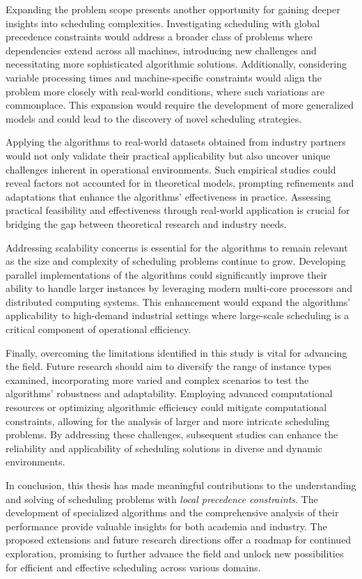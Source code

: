 Expanding the problem scope presents another opportunity for gaining deeper insights into scheduling complexities. Investigating scheduling with global precedence constraints would address a broader class of problems where dependencies extend across all machines, introducing new challenges and necessitating more sophisticated algorithmic solutions. Additionally, considering variable processing times and machine-specific constraints would align the problem more closely with real-world conditions, where such variations are commonplace. This expansion would require the development of more generalized models and could lead to the discovery of novel scheduling strategies.

Applying the algorithms to real-world datasets obtained from industry partners would not only validate their practical applicability but also uncover unique challenges inherent in operational environments. Such empirical studies could reveal factors not accounted for in theoretical models, prompting refinements and adaptations that enhance the algorithms' effectiveness in practice. Assessing practical feasibility and effectiveness through real-world application is crucial for bridging the gap between theoretical research and industry needs.

Addressing scalability concerns is essential for the algorithms to remain relevant as the size and complexity of scheduling problems continue to grow. Developing parallel implementations of the algorithms could significantly improve their ability to handle larger instances by leveraging modern multi-core processors and distributed computing systems. This enhancement would expand the algorithms' applicability to high-demand industrial settings where large-scale scheduling is a critical component of operational efficiency.

Finally, overcoming the limitations identified in this study is vital for advancing the field. Future research should aim to diversify the range of instance types examined, incorporating more varied and complex scenarios to test the algorithms' robustness and adaptability. Employing advanced computational resources or optimizing algorithmic efficiency could mitigate computational constraints, allowing for the analysis of larger and more intricate scheduling problems. By addressing these challenges, subsequent studies can enhance the reliability and applicability of scheduling solutions in diverse and dynamic environments.

In conclusion, this thesis has made meaningful contributions to the understanding and solving of scheduling problems with \textit{local precedence constraints}. The development of specialized algorithms and the comprehensive analysis of their performance provide valuable insights for both academia and industry. The proposed extensions and future research directions offer a roadmap for continued exploration, promising to further advance the field and unlock new possibilities for efficient and effective scheduling across various domains.
